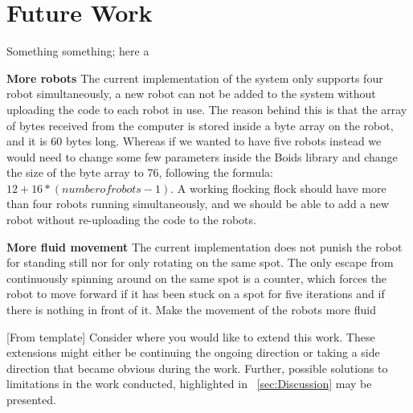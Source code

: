 \section{Future Work}
\label{sec:futureWork}

Something something; here a 

\textbf{More robots}
The current implementation of the system only supports four robot simultaneously, a new robot can not be added to the system without uploading the code to each robot in use. The reason behind this is that the array of bytes received from the computer is stored inside a byte array on the robot, and it is 60 bytes long. Whereas if we wanted to have five robots instead we would need to change some few parameters inside the Boids library and change the size of the byte array to 76, following the formula: $ 12+16*(number of robots - 1) $.
A working flocking flock should have more than four robots running simultaneously, and we should be able to add a new robot without re-uploading the code to the robots.

\textbf{More fluid movement}
The current implementation does not punish the robot for standing still nor for only rotating on the same spot. The only escape from continuously spinning around on the same spot is a counter, which forces the robot to move forward if it has been stuck on a spot for five iterations and if there is nothing in front of it. 
Make the movement of the robots more fluid

[From template] %
Consider where you would like to extend this work. These extensions might either be continuing the ongoing direction or taking a side direction that became obvious during the work. Further, possible solutions to limitations in the work conducted, highlighted in ~\ref{sec:Discussion} may be presented. 



